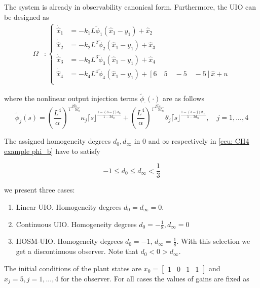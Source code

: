 \documentclass[11pt,letterpaper,twoside,openright]{report}
\newcommand{\sig}[2]{\lceil#1\rfloor^{#2}}
\begin{document}
The system is already in observability canonical form. Furthermore, the UIO can be designed as
\begin{equation}
	\begin{split}
		\Omega &: \left\{
		\begin{array}{rl}
			\dot{\hat{x}}_{1} &= -k_{1}L \tilde{\phi}_{1}( \hat{x}_{1}-y_{1} ) + \hat{x}_{2} \\
			\dot{\hat{x}}_{2} &= -k_{2}L^{2} \tilde{\phi}_{2}( \hat{x}_{1}-y_{1} ) + \hat{x}_{3} \\
			\dot{\hat{x}}_{3} &= -k_{3}L^{3}  \tilde{\phi}_{3}( \hat{x}_{1}-y_{1} ) + \hat{x}_{4} \\
			\dot{\hat{x}}_{4} &= -k_{4}L^{4} \tilde{\phi}_{4}( \hat{x}_{1}-y_{1} ) + [6 \quad 5 \quad -5 \quad -5]\hat{x} + u \\
		\end{array}
		\right.
	\end{split}
\end{equation}

where the nonlinear output injection terms $\tilde{\phi}_{\cdot}(\cdot)$ are as follows
\begin{equation}\label{ecu: CH4 example phi_b}
	\tilde{\phi}_{j}(s) = \left( \frac{L^{4}}{\alpha}\right)^{\frac{jd_0}{1-3d_0}}\kappa_{j} \sig{s}{\frac{1-(3-j)d_0}{1-3d_0}} + \left( \frac{L^{4}}{\alpha}\right)^{\frac{jd_{\infty}}{1-3d_{\infty}}}\theta_{j} \sig{s}{\frac{1-(3-j)d_{\infty}}{1-3d_{\infty}}}, \quad j=1,...,4
\end{equation}	

The assigned homogeneity degrees $d_0,d_{\infty}$ in $0$ and $\infty$ respectively in \eqref{ecu: CH4 example phi_b} have to satisfy

\begin{equation}
	-1 \leq d_0 \leq d_{\infty} < \frac{1}{3}
\end{equation}

we present three cases:
\begin{enumerate}
	\item Linear UIO. Homogeneity degrees $d_0=d_{\infty}=0$.
	\item Continuous UIO. Homogeneity degrees $d_0=-\frac{1}{8},d_{\infty}=0$
	\item HOSM-UIO. Homogeneity degrees $d_0=-1$, $d_{\infty}=\frac{1}{8}$. With this selection we get a discontinuous observer. Note that $d_0<0>d_{\infty}$.
\end{enumerate}

The initial conditions of the plant states are $x_0=\begin{bmatrix}	1 & 0 & 1 & 1 \end{bmatrix}$ and $\hat{x}_j=5,j=1,...,4$ for the observer. For all cases the values of gains are fixed as
\end{document}

